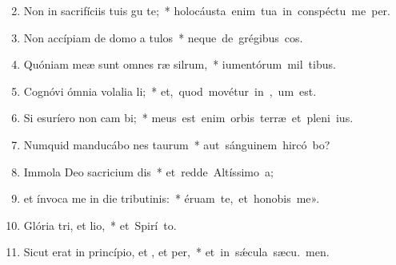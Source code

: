 \begin{flushleft}
\begin{enumerate}[leftmargin=*]
\setcounter{enumi}{1}

\item Non in sacrifíciis tuis gu te;~* \mbox{holocáusta enim tua in conspéctu me  per.}

\item Non accípiam de domo a tulos~* \mbox{neque de grégibus  cos.}

\item Quóniam meæ sunt omnes ræ silrum,~* \mbox{iumentórum mil  tibus.}

\item Cognóvi ómnia volalia li;~* \mbox{et, quod movétur in , um est.}

\item Si esuríero non cam bi;~* \mbox{meus est enim orbis terræ et pleni ius.}

\item Numquid manducábo nes taurum~* \mbox{aut sánguinem hircó bo?}

\item Immola Deo sacricium dis~* \mbox{et redde Altíssimo  a;}

\item et ínvoca me in die tributinis:~* \mbox{éruam te, et honobis me».}

\item Glória tri, et lio,~* \mbox{et Spirí to.}

\item Sicut erat in princípio, et , et per,~* \mbox{et in s\'{\ae}cula sæcu. men.}

\end{enumerate}
\end{flushleft}

